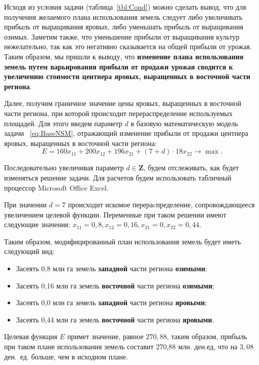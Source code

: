 Исходя из условия задачи (таблица~\ref{tbl:Cond})
можно сделать вывод, что для получения желаемого плана
использования земель следует либо увеличивать прибыль от выращивания яровых, либо
уменьшать прибыль от выращивания озимых.
Заметим также, что уменьшение прибыли от выращивания культур нежелательно, так как это негативно сказывается на 
общей прибыли от урожая.
Таким образом, мы пришли к выводу, что \textbf{изменение плана использования земель путем варьирования прибыли
  от продажи урожая сводится к увеличению стоимости центнера яровых, выращенных в восточной части региона}. 

Далее, получим граничное значение цены яровых, выращенных в восточной части региона, при которой происходит 
перераспределение используемых площадей. Для этого введем параметр $ d $ в базовую математическую модель задачи
~\eqref{eq:BaseNSM}, отражающий изменение прибыли от продажи центнера яровых, выращенных в восточной части региона:
\begin{equation}
  E = 160x_{11} + 200x_{12} + 196x_{21} + (7+d) \cdot 18x_{22} \rightarrow \max.
\end{equation}

Последовательно увеличивая параметр $ d \in \pmb{Z} $, будем отслеживать, как будет изменяться решение задачи.
Для расчетов будем использовать табличный процессор Microsoft Office Excel.

При значении $ d = 7 $ происходит искомое перераcпределение, сопровождающееся увеличением целевой функции.
Переменные при таком решении имеют следующие значения:  
$ x_{11} = 0{,}8, x_{12} = 0{,}16, x_{21} = 0, x_{22} = 0{,}44 $.

Таким образом, модифицированный план использования земель будет иметь следующий вид:

\begin{itemize}
\item Засеять 0{,}8 млн га земель \textbf{западной} части региона \textbf{озимыми};
\item Засеять 0{,}16 млн га земель \textbf{восточной} части региона \textbf{озимыми};
\item Засеять 0{,}0 млн га земель \textbf{западной} части региона \textbf{яровыми};
\item Засеять 0{,}44 млн га земель \textbf{восточной} части региона \textbf{яровыми}.
\end{itemize}

Целевая функция $ E $ примет значение, равное $ 270{,}88 $, таким образом, прибыль при таком
плане использования земель составит 270{,}88 млн. ден.ед, что на $ 3{,}08 $ ден.~ед. больше,
чем в исходном плане.

